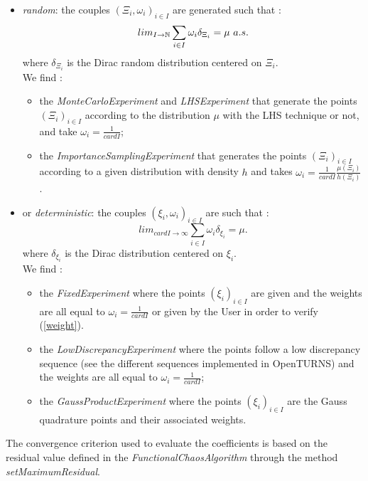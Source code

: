 \begin{itemize}
\item \emph{random}: the couples $(\Xi_i, \omega_i)_{i \in I}$ are generated such that :
  \begin{equation}
    lim_{I \rightarrow {\mathbb N}} \sum_{i \in I} \omega_i \delta_{\Xi_i} = \mu \, \, a.s.
  \end{equation}
  where $\delta_{\Xi_i}$ is the Dirac random distribution centered on $\Xi_i$.\\
  We find :
  \begin{itemize}
  \item the \emph{MonteCarloExperiment} and \emph{LHSExperiment} that generate the points $(\Xi_i)_{i \in I}$ according to the distribution $\mu$ with the LHS technique or not, and take $\omega_i = \displaystyle \frac{1}{card I}$;
  \item the \emph{ImportanceSamplingExperiment} that generates the points $(\Xi_i)_{i \in I}$according to a given distribution with density $h$ and  takes $\omega_i = \displaystyle \frac{1}{card I}\frac{\mu(\Xi_i)}{h(\Xi_i)}$.
  \end{itemize}

\item or \emph{deterministic}: the couples $(\xi_i, \omega_i)_{i \in I}$ are  such that :
  \begin{equation}\label{weight}
    lim_{card I \rightarrow\infty} \sum_{i \in I} \omega_i \delta_{\xi_i} = \mu.
  \end{equation}
  where $\delta_{\xi_i}$ is the Dirac distribution centered on $\xi_i$.\\
  We find :
  \begin{itemize}
  \item the \emph{FixedExperiment} where the points $(\xi_i)_{i \in I}$ are given and the weights are all equal to $\omega_i = \displaystyle \frac{1}{card I}$ or given by the User in order to verify (\ref{weight}).
  \item the \emph{LowDiscrepancyExperiment} where the points follow a  low discrepancy sequence (see the different sequences implemented in OpenTURNS) and the weights are all equal to $\omega_i = \displaystyle \frac{1}{card I}$;
  \item the \emph{GaussProductExperiment} where the points $(\xi_i)_{i \in I}$ are the Gauss quadrature points and their associated weights.
  \end{itemize}
\end{itemize}


The convergence criterion used to evaluate the coefficients is based on the residual value defined in the {\itshape FunctionalChaosAlgorithm} through the method {\itshape setMaximumResidual}.\\

